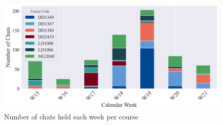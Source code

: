 \begin{figure}[H]
    \centering
    \includegraphics[width=1\textwidth]{results/plots/assets/usage-04-number-of-chats-per-calendar-week-per-course.png}
    \caption{Number of chats held each week per course}
    \label{fig:usage_03_number_of_chats_per_calendar_week_per_course}
\end{figure}